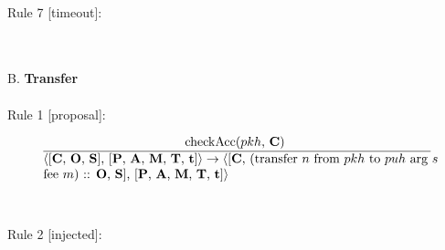 \documentclass[a4paper]{llncs}
\begin{document}
~\\
Rule 7 [timeout]:
\begin{mathpar}
\end{mathpar}
~\\
~\\
B. \textbf{Transfer}
\\
~\\
Rule 1 [proposal]:

\begin{equation}{}
\frac{\text{checkAcc($pkh$, \ACCOUNTS)  }}{\parbox{4.2in}{\text{$\langle$[\ACCOUNTS, \OPERATIONS, \CONTRACTS], [\PENDING, \ACCEPTED, \MANAGERS, \CONTRACTORS, \TIME]$\rangle \rightarrow \langle$[\ACCOUNTS, (transfer ${n}$ from ${pkh}$ to  ${puh}$ arg ${s}$ }  \\
\text{fee ${m}$) :: \OPERATIONS, \CONTRACTS], [\PENDING, \ACCEPTED, \MANAGERS, \CONTRACTORS, \TIME]$\rangle$}}} 
\end{equation}
~\\
~\\
Rule 2 [injected]:
\end{document}
